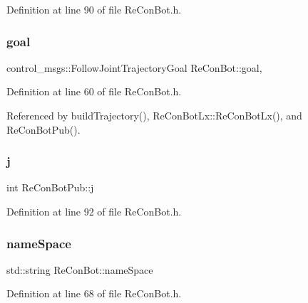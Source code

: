 Definition at line 90 of file Re\+Con\+Bot.\+h.

\mbox{\label{class_re_con_bot_a9bd1c7ddf2376e2e68ea5d8bd8c3f505}} 
\subsubsection{\texorpdfstring{goal}{goal}}
{\footnotesize\ttfamily control\+\_\+msgs\+::\+Follow\+Joint\+Trajectory\+Goal Re\+Con\+Bot\+::goal\hspace{0.3cm}{\ttfamily [protected]}, {\ttfamily [inherited]}}



Definition at line 60 of file Re\+Con\+Bot.\+h.



Referenced by build\+Trajectory(), Re\+Con\+Bot\+Lx\+::\+Re\+Con\+Bot\+Lx(), and Re\+Con\+Bot\+Pub().

\mbox{\label{class_re_con_bot_pub_a1d9d82f366eeb794ffa28630de286710}} 
\subsubsection{\texorpdfstring{j}{j}}
{\footnotesize\ttfamily int Re\+Con\+Bot\+Pub\+::j\hspace{0.3cm}{\ttfamily [protected]}}



Definition at line 92 of file Re\+Con\+Bot.\+h.

\mbox{\label{class_re_con_bot_a40ca07cd606988b78664c4a52fd8dc59}} 
\subsubsection{\texorpdfstring{name\+Space}{nameSpace}}
{\footnotesize\ttfamily std\+::string Re\+Con\+Bot\+::name\+Space\hspace{0.3cm}{\ttfamily [inherited]}}



Definition at line 68 of file Re\+Con\+Bot.\+h.



